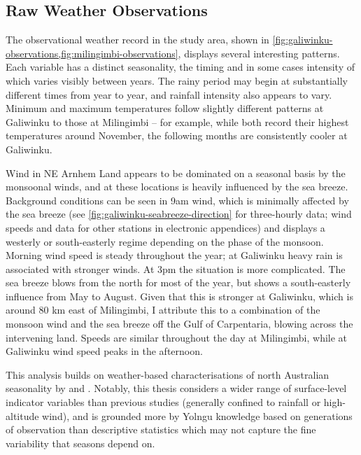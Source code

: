 \subsection{Raw Weather Observations}
\label{ssec:disc-weather}

The observational weather record in the study area, shown in
\cref{fig:galiwinku-observations,fig:milingimbi-observations}, displays
several interesting patterns.  Each variable has a distinct seasonality,
the timing and in some cases intensity of which varies visibly between years.
The rainy period may begin at substantially different times from year to year,
and rainfall intensity also appears to vary.
%
Minimum and maximum temperatures follow slightly different patterns at
Galiwinku to those at Milingimbi -- for example, while both record their
highest temperatures around November, the following months are consistently
cooler at Galiwinku.

Wind in NE Arnhem Land appears to be dominated on a seasonal basis by the
monsoonal winds, and at these locations is heavily influenced by the sea
breeze.  Background conditions can be seen in 9am wind, which is minimally
affected by the sea breeze (see \cref{fig:galiwinku-seabreeze-direction}
for three-hourly data; wind speeds and data for other stations in electronic appendices)
and displays a westerly or south-easterly regime depending on the phase of the monsoon.
Morning wind speed is steady throughout the year; at Galiwinku heavy rain
is associated with stronger winds.
%
At 3pm the situation is more complicated.  The sea breeze blows from the north
for most of the year, but shows a south-easterly influence from May to
August.  Given that this is stronger at Galiwinku, which is around 80 km
east of Milingimbi, I attribute this to a combination of the monsoon wind
and the sea breeze off the Gulf of Carpentaria, blowing across the intervening
land.  Speeds are similar throughout the day at Milingimbi, while at Galiwinku
wind speed peaks in the afternoon.


This analysis builds on weather-based characterisations of north Australian
seasonality by \citet{cook2001} and \citet{holland1985}.  Notably, this thesis
considers a wider range of surface-level indicator variables than previous
studies (generally confined to rainfall or high-altitude wind), and is
grounded more by Yolngu knowledge based on generations of observation than
descriptive statistics which may not capture the fine variability that seasons
depend on.



